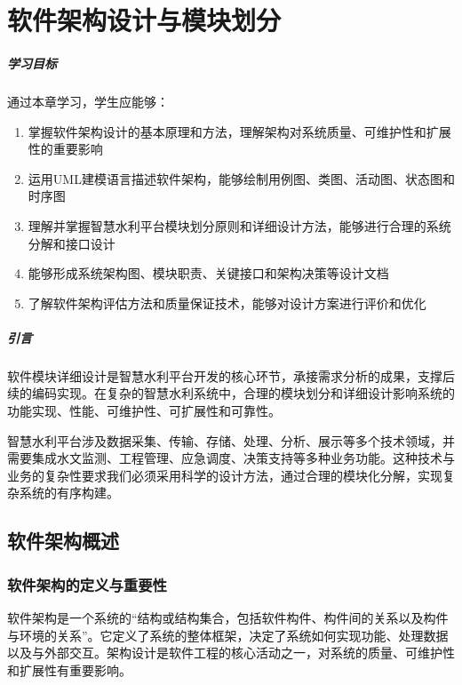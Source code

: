 \chapter{软件架构设计与模块划分}

\paragraph*{学习目标}

通过本章学习，学生应能够：
\begin{enumerate}
\def\labelenumi{\arabic{enumi}.}
\tightlist
\item
  掌握软件架构设计的基本原理和方法，理解架构对系统质量、可维护性和扩展性的重要影响
\item
  运用UML建模语言描述软件架构，能够绘制用例图、类图、活动图、状态图和时序图
\item
  理解并掌握智慧水利平台模块划分原则和详细设计方法，能够进行合理的系统分解和接口设计
\item
  能够形成系统架构图、模块职责、关键接口和架构决策等设计文档
\item
  了解软件架构评估方法和质量保证技术，能够对设计方案进行评价和优化
\end{enumerate}

\paragraph*{引言}

软件模块详细设计是智慧水利平台开发的核心环节，承接需求分析的成果，支撑后续的编码实现。在复杂的智慧水利系统中，合理的模块划分和详细设计影响系统的功能实现、性能、可维护性、可扩展性和可靠性。

智慧水利平台涉及数据采集、传输、存储、处理、分析、展示等多个技术领域，并需要集成水文监测、工程管理、应急调度、决策支持等多种业务功能。这种技术与业务的复杂性要求我们必须采用科学的设计方法，通过合理的模块化分解，实现复杂系统的有序构建。

\section{软件架构概述}

\subsection{软件架构的定义与重要性}

软件架构是一个系统的“结构或结构集合，包括软件构件、构件间的关系以及构件与环境的关系”。它定义了系统的整体框架，决定了系统如何实现功能、处理数据以及与外部交互。架构设计是软件工程的核心活动之一，对系统的质量、可维护性和扩展性有重要影响\cite{ISO42010,clements2010,richards2020,shaw1996}。


